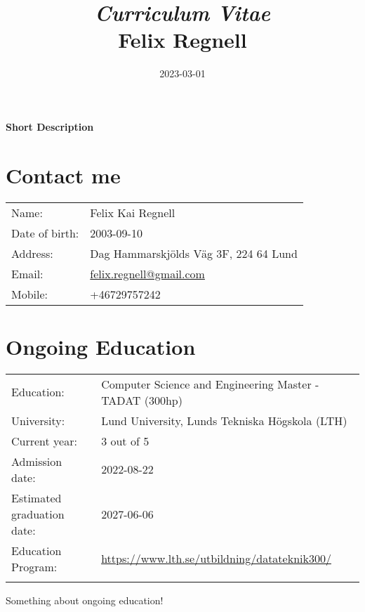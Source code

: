 \documentclass{cv}
\title{\vspace{-0.5em}\textit{Curriculum Vitae}\\\textbf{Felix Regnell}}
\date{\vspace{-3.0em} 2023-03-01}
\begin{document}
\maketitle


\vspace{-2.1em}\begin{center}
	\textbf{Short Description}
\end{center}

\vspace{1.1em}\section{Contact me}

\begin{tabular*}{\textwidth}{p{5cm} l}
	Name:           & Felix Kai Regnell \\
	Date of birth:  & 2003-09-10 \\
	Address:        & Dag Hammarskjölds Väg 3F, 224 64 Lund \\
	Email:          & \url{felix.regnell@gmail.com} \\
	Mobile:         & +46729757242
\end{tabular*}

\section{Ongoing Education}

\begin{tabular*}{\textwidth}{p{5cm} l}
	Education:                  & Computer Science and Engineering Master - TADAT (300hp) \\
	University:                 & Lund University, Lunds Tekniska Högskola (LTH) \\
	Current year:               & 3 out of 5\\
	Admission date:             & 2022-08-22  \\
	Estimated graduation date:  & 2027-06-06 \\
	Education Program:& \url{https://www.lth.se/utbildning/datateknik300/}\\ \\
\end{tabular*}

Something about ongoing education!
\end{document}
